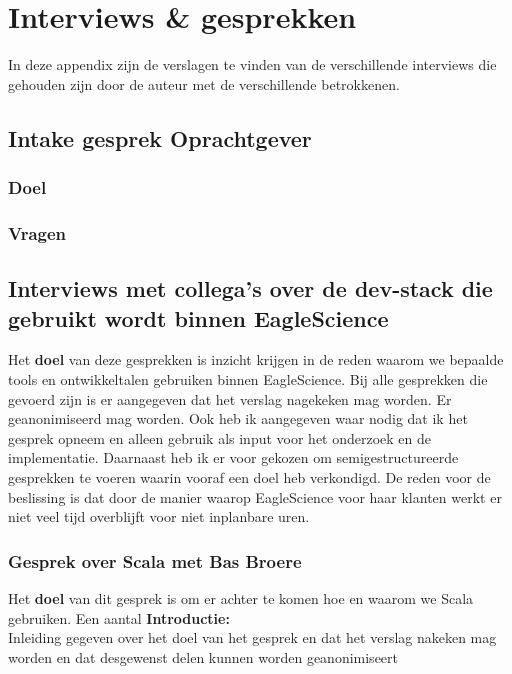 
\chapter{Interviews \& gesprekken}\label{app:Interviews}

In deze appendix zijn de verslagen te vinden van de verschillende interviews die gehouden zijn door de auteur met de verschillende betrokkenen.
\section{Intake gesprek Oprachtgever}\label{sec:intake-gesprek-oprachtgever}

\subsection{Doel}\label{subsec:intakeDoel}
\lipsum[01]
\subsection{Vragen}\label{subsec:intakeVragen}
\lipsum[01]

\lipsum[01]

\lipsum[01]

\section{Interviews met collega's over de dev-stack die gebruikt wordt binnen EagleScience}\label{sec:dev-stackInterviews}


Het \textbf{doel} van deze gesprekken is inzicht krijgen in de reden waarom we bepaalde tools en ontwikkeltalen gebruiken binnen EagleScience. Bij alle gesprekken die gevoerd zijn is er aangegeven dat het verslag nagekeken mag worden. Er geanonimiseerd mag worden. Ook heb ik aangegeven waar nodig dat ik het gesprek opneem en alleen gebruik als input voor het onderzoek en de implementatie. Daarnaast heb ik er voor gekozen om semigestructureerde gesprekken te voeren waarin vooraf een doel heb verkondigd. De reden voor de beslissing is dat door de manier waarop EagleScience voor haar klanten werkt er niet veel tijd overblijft voor niet inplanbare uren.

\subsection{Gesprek over Scala met Bas Broere}\label{subsec:gesprek-over-scala-met-bas-broere}
Het \textbf{doel} van dit gesprek is om er achter te komen hoe en waarom we Scala gebruiken. Een aantal
\textbf{Introductie: }\\
Inleiding gegeven over het doel van het gesprek en dat het verslag nakeken mag worden en dat desgewenst delen kunnen worden geanonimiseert
\subsection{}\label{subsec:dev-stackVragen}

